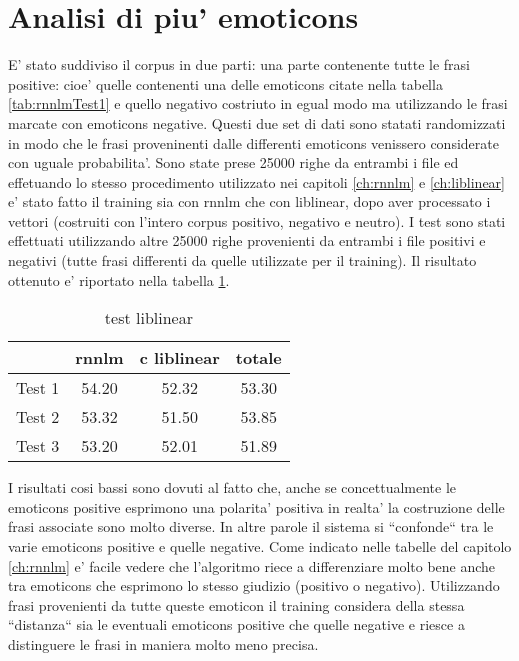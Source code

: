 \documentclass[a4paper,11pt]{book}
\theoremstyle{definition}
\begin{document}
\section{Analisi di piu' emoticons}
E' stato suddiviso il corpus in due parti: una parte contenente tutte le frasi positive: cioe' quelle contenenti una delle emoticons citate nella tabella \ref{tab:rnnlmTest1} e quello negativo costriuto in egual modo ma utilizzando le frasi marcate con emoticons negative. Questi due set di dati sono statati randomizzati in modo che le frasi proveninenti dalle differenti emoticons venissero considerate con uguale probabilita'. Sono state prese 25000 righe da entrambi i file ed effetuando lo stesso procedimento utilizzato nei capitoli \ref{ch:rnnlm} e \ref{ch:liblinear} e' stato fatto il training sia con rnnlm che con liblinear, dopo aver processato i vettori (costruiti con l'intero corpus positivo, negativo e neutro).
I test sono stati effettuati utilizzando altre 25000 righe provenienti da entrambi i file positivi e negativi (tutte frasi differenti da quelle utilizzate per il training). Il risultato ottenuto e' riportato nella tabella \ref{tab:test2}.
\begin{table}[h]
\begin{center}
\begin{tabular}{|c|c|c|c|}
\hline
& rnnlm & c liblinear & totale \\
\hline
\hline
Test 1 & 54.20 & 52.32 & 53.30 \\
\hline
Test 2 & 53.32 &  51.50 &  53.85  \\
\hline
Test 3 & 53.20 & 52.01 &  51.89 \\
\hline
\end{tabular}
\end{center}
\caption{test liblinear}
\label{tab:test2}
\end{table}

I risultati cosi bassi sono dovuti al fatto che, anche se concettualmente le emoticons positive esprimono una polarita' positiva in realta' la costruzione delle frasi associate sono molto diverse. 
In altre parole il sistema si ``confonde`` tra le varie emoticons positive e quelle negative. Come indicato nelle tabelle del capitolo \ref{ch:rnnlm} e' facile vedere che l'algoritmo riece a differenziare molto bene anche tra emoticons che esprimono lo stesso giudizio (positivo o negativo). Utilizzando frasi provenienti da tutte queste emoticon il training considera della stessa ``distanza`` sia le eventuali emoticons positive che quelle negative e riesce a distinguere le frasi in maniera molto meno precisa.
\end{document}
